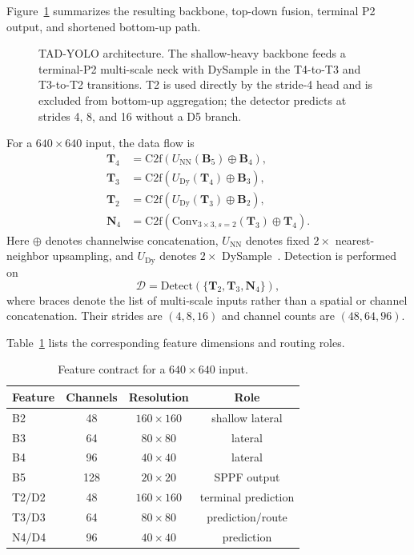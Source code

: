 \documentclass[conference]{IEEEtran}
\begin{document}
Figure~\ref{fig:architecture} summarizes the resulting backbone, top-down
fusion, terminal P2 output, and shortened bottom-up path.

\begin{figure}[t]
\centering

\caption{TAD-YOLO architecture.  The shallow-heavy backbone feeds a
terminal-P2 multi-scale neck with DySample in the T4-to-T3 and T3-to-T2
transitions.  T2 is used directly by the stride-4 head and is excluded from
bottom-up aggregation; the detector predicts at strides 4, 8, and 16 without
a D5 branch.}
\label{fig:architecture}
\end{figure}

For a $640\times640$ input, the data flow is
\begin{align}
\mathbf{T}_4 &= \mathrm{C2f}\!\left(
    U_{\mathrm{NN}}(\mathbf{B}_5)\oplus\mathbf{B}_4\right), \\
\mathbf{T}_3 &= \mathrm{C2f}\!\left(
    U_{\mathrm{Dy}}(\mathbf{T}_4)\oplus\mathbf{B}_3\right), \\
\mathbf{T}_2 &= \mathrm{C2f}\!\left(
    U_{\mathrm{Dy}}(\mathbf{T}_3)\oplus\mathbf{B}_2\right), \\
\mathbf{N}_4 &= \mathrm{C2f}\!\left(
    \mathrm{Conv}_{3\times3,s=2}(\mathbf{T}_3)\oplus\mathbf{T}_4\right).
\end{align}
Here $\oplus$ denotes channelwise concatenation, $U_{\mathrm{NN}}$ denotes
fixed $2\times$ nearest-neighbor upsampling, and $U_{\mathrm{Dy}}$ denotes
$2\times$ DySample~\cite{liu2023dysample}.  Detection is performed on
\begin{equation}
\mathcal{D}=\mathrm{Detect}\!\left(
\{\mathbf{T}_2,\mathbf{T}_3,\mathbf{N}_4\}\right),
\end{equation}
where braces denote the list of multi-scale inputs rather than a spatial or
channel concatenation.  Their strides are $(4,8,16)$ and channel counts are
$(48,64,96)$.

Table~\ref{tab:feature_contract} lists the corresponding feature dimensions
and routing roles.

\begin{table}[t]
\caption{Feature contract for a $640\times640$ input.}
\label{tab:feature_contract}
\centering
\small
\begin{tabular}{lccc}
\toprule
Feature & Channels & Resolution & Role \\
\midrule
B2 & 48  & $160\times160$ & shallow lateral \\
B3 & 64  & $80\times80$   & lateral \\
B4 & 96  & $40\times40$   & lateral \\
B5 & 128 & $20\times20$   & SPPF output \\
T2/D2 & 48 & $160\times160$ & terminal prediction \\
T3/D3 & 64 & $80\times80$ & prediction/route \\
N4/D4 & 96 & $40\times40$ & prediction \\
\bottomrule
\end{tabular}
\end{table}
\end{document}

